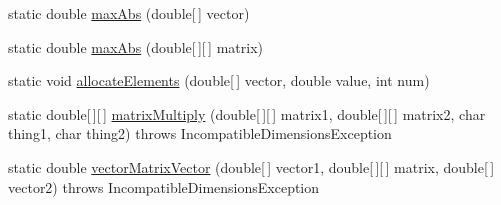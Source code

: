 \begin{DoxyCompactItemize}
\item 
static double \hyperlink{classOMP2D_1_1MatrixOperations_a20c8df75f73908438dd418cb803d077e}{max\-Abs} (double\mbox{[}$\,$\mbox{]} vector)
\item 
static double \hyperlink{classOMP2D_1_1MatrixOperations_a3326a590f1c188296d0e14cd6f5476ad}{max\-Abs} (double\mbox{[}$\,$\mbox{]}\mbox{[}$\,$\mbox{]} matrix)
\item 
static void \hyperlink{classOMP2D_1_1MatrixOperations_a9dfd3ba69faf8f5c905a5c9dcac30cdd}{allocate\-Elements} (double\mbox{[}$\,$\mbox{]} vector, double value, int num)
\item 
static double\mbox{[}$\,$\mbox{]}\mbox{[}$\,$\mbox{]} \hyperlink{classOMP2D_1_1MatrixOperations_a66a0e1bf820558880db67d2efac229cb}{matrix\-Multiply} (double\mbox{[}$\,$\mbox{]}\mbox{[}$\,$\mbox{]} matrix1, double\mbox{[}$\,$\mbox{]}\mbox{[}$\,$\mbox{]} matrix2, char thing1, char thing2)  throws Incompatible\-Dimensions\-Exception 
\item 
static double \hyperlink{classOMP2D_1_1MatrixOperations_aa2f4938d53dcbb632fbf2e499705f29f}{vector\-Matrix\-Vector} (double\mbox{[}$\,$\mbox{]} vector1, double\mbox{[}$\,$\mbox{]}\mbox{[}$\,$\mbox{]} matrix, double\mbox{[}$\,$\mbox{]} vector2)  throws Incompatible\-Dimensions\-Exception 
\end{DoxyCompactItemize}


